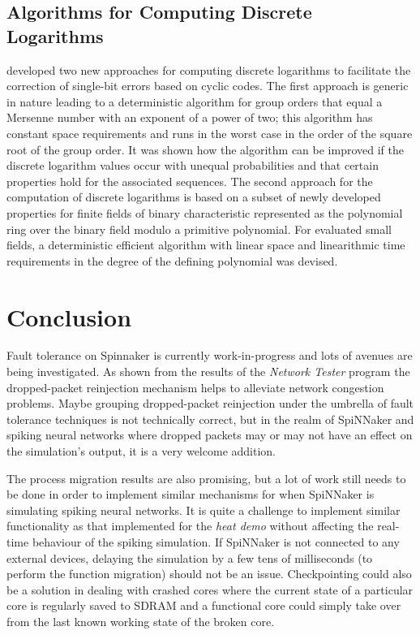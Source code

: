 \documentclass[a4paper, 11pt]{article}
\newlength\drop
\begin{document}
\subsection{Algorithms for Computing Discrete Logarithms}
\citet{grymel2013error} developed two new approaches for computing discrete logarithms to facilitate the correction of single-bit errors based on cyclic codes. The first approach is generic in nature leading to a deterministic algorithm for group orders that equal a Mersenne number with an exponent of a power of two; this algorithm has constant space requirements and runs in the worst case in the order of the square root of the group order. It was shown how the algorithm can be improved if the discrete logarithm values occur with unequal probabilities and that certain properties hold for the associated sequences. The second approach for the computation of discrete logarithms is based on a subset of newly developed properties for finite fields of binary characteristic represented as the polynomial ring over the binary field modulo a primitive polynomial. For evaluated small fields, a deterministic efficient algorithm with linear space and linearithmic time requirements in the degree of the defining polynomial was devised.

\newpage
\section{Conclusion}
Fault tolerance on Spinnaker is currently work-in-progress and lots of avenues are being investigated. As shown from the results of the \emph{Network Tester} program the dropped-packet reinjection mechanism helps to alleviate network congestion problems. Maybe grouping dropped-packet reinjection under the umbrella of fault tolerance techniques is not technically correct, but in the realm of SpiNNaker and spiking neural networks where dropped packets may or may not have an effect on the simulation's output, it is a very welcome addition.

The process migration results are also promising, but a lot of work still needs to be done in order to implement similar mechanisms for when SpiNNaker is simulating spiking neural networks. It is quite a challenge to implement similar functionality as that implemented for the \emph{heat demo} without affecting the real-time behaviour of the spiking simulation. If SpiNNaker is not connected to any external devices, delaying the simulation by a few tens of milliseconds (to perform the function migration) should not be an issue. Checkpointing could also be a solution in dealing with crashed cores where the current state of a particular core is regularly saved to SDRAM and a functional core could simply take over from the last known working state of the broken core.
\end{document}
